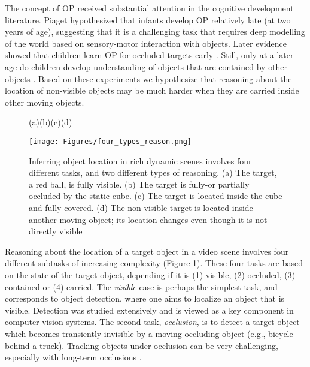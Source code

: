 \documentclass[]{llncs}
\newcommand{\figref}[1]{Figure \ref{#1}}
\begin{document}
The concept of OP received substantial attention in the cognitive development literature. Piaget hypothesized that infants develop OP relatively late (at two years of age), suggesting that it is a challenging task that requires deep modelling of the world based on sensory-motor interaction with objects. Later evidence showed that children learn OP for occluded targets early \cite{aguiar1999,baillargeon1991object}. Still, only at a later age do children develop understanding of objects that are contained by other objects \cite{smitsman2009significance}. Based on these experiments we hypothesize that reasoning about the location of non-visible objects may be much harder when they are carried inside other moving objects.

\begin{figure}[t]
    \hspace{60pt}(a)\hspace{55pt}(b)\hspace{70pt}(c)\hspace{60pt}(d)
    \begin{center}
    \texttt{[image: Figures/four\_types\_reason.png]}
    \caption{Inferring object location in rich dynamic scenes involves four different tasks, and two different types of reasoning. (a) The target, a red ball, is fully visible. (b) The target is fully-or partially occluded by the static cube. (c) The target is located inside the cube and fully covered. (d) The non-visible target is located inside another moving object; its location changes even though it is not directly visible \label{fig:object_per}}
    \end{center}
\end{figure}

Reasoning about the location of a target object in a video scene involves four different subtasks of increasing complexity (\figref{fig:object_per}). These four tasks are based on the state of the target object, depending if it is  (1) visible, (2) occluded, (3) contained or (4) carried. The \textit{visible} case is perhaps the simplest task, and corresponds to object detection, where one aims to localize an object that is visible. Detection was studied extensively and is viewed as a key component in computer vision systems.
The second task, \textit{occlusion}, is to detect a target object which becomes transiently invisible by a moving occluding object (e.g., bicycle behind a truck). Tracking objects under occlusion can be very challenging, especially with long-term occlusions \cite{mojtaba2019deep,Kristan2018TheSV,fan2019lasot,wu2015object}.
\end{document}
